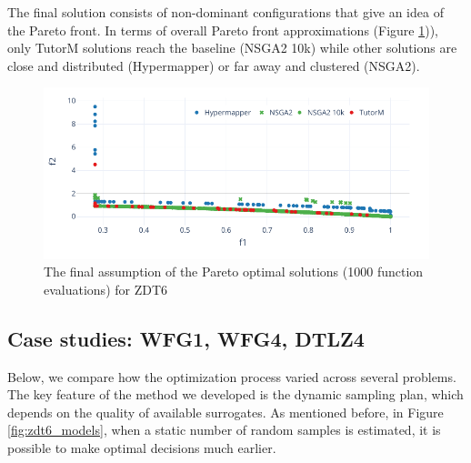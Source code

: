 
    
    The final solution consists of non-dominant configurations that give an idea of the Pareto front. In terms of overall Pareto front approximations (Figure \ref{fig:zdt6_front})), only TutorM solutions reach the baseline (NSGA2 10k) while other solutions are close and distributed (Hypermapper) or far away and clustered (NSGA2).

        \begin{figure}[h]
            \centering   
            \includegraphics[width=\textwidth]{content/images/zdt6_front}
            \caption[The final assumption of the Pareto optimal solutions (1000 function evaluations) for ZDT6]{The final assumption of the Pareto optimal solutions (1000 function evaluations) for ZDT6}
            \label{fig:zdt6_front}
        \end{figure}

    \subsection*{Case studies: WFG1, WFG4, DTLZ4}
    Below, we compare how the optimization process varied across several problems.
    The key feature of the method we developed is the dynamic sampling plan, which depends on the quality of available surrogates. 
    As mentioned before, in Figure \ref{fig:zdt6_models}, when a static number of random samples is estimated, it is possible to make optimal decisions much earlier.         
    

